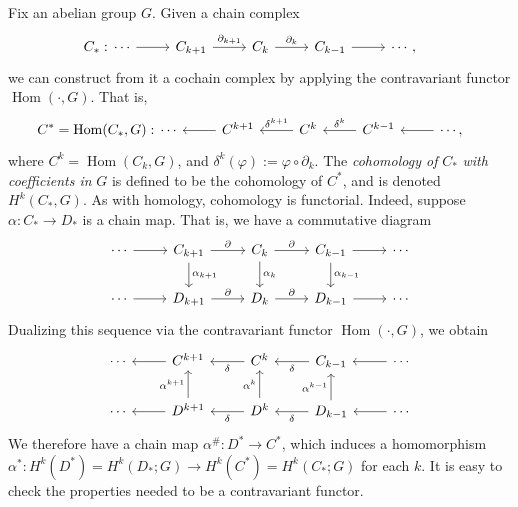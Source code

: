 \documentclass{book}
\renewcommand{\phi}{\varphi}
\DeclareMathOperator{\Hom}{Hom}
\theoremstyle{definition}
\theoremstyle{remark}
\numberwithin{equation}{section}
\begin{document}
Fix an abelian group $G$. Given a chain complex
\begin{equation}
    \begin{aligned}
        C_*: 
        & 
        \begin{tikzcd}
            \cdots \arrow[r] & C_{k+1} \arrow[r,"\partial_{k+1}"] & C_k \arrow[r,"\partial_k"] & C_{k-1} \arrow[r] & \cdots,
        \end{tikzcd} 
        & 
        \hphantom{ }
    \end{aligned} 
\end{equation}
we can construct from it a cochain complex by applying the contravariant functor $\Hom(\cdot,G)$. That is, 
\begin{equation} \label{eq:dualOfAChainComplex}
    \begin{aligned}
        C^* = \Hom(C_*,G): 
        & 
        \begin{tikzcd}
            \cdots & C^{k+1} \arrow[l] & C^k \arrow[l,"\delta^{k+1}" above] & C^{k-1} \arrow[l,"\delta^k" above] & \cdots \arrow[l],
        \end{tikzcd} 
        & 
        \hphantom{ }
    \end{aligned} 
\end{equation}
where $C^k = \Hom(C_k,G)$, and $\delta^k(\phi) := \phi\circ\partial_k$. The \textit{cohomology of} $C_*$ \textit{with coefficients in} $G$ is defined to be the cohomology of $C^*$, and is denoted $H^k(C_*,G)$. As with homology, cohomology is functorial. Indeed, suppose $\alpha \colon C_* \to D_*$ is a chain map. That is, we have a commutative diagram 
\begin{equation} \begin{tikzcd}
    \cdots \arrow[r] & C_{k+1} \arrow[r,"\partial"] \arrow[d,"\alpha_{k+1}"] & C_{k} \arrow[r,"\partial"] \arrow[d,"\alpha_{k}"] & C_{k-1} \arrow[r] \arrow[d,"\alpha_{k-1}"] & \cdots \\
    \cdots \arrow[r] & D_{k+1} \arrow[r,"\partial"]                          & D_{k} \arrow[r,"\partial"]                        & D_{k-1} \arrow[r]                          & \cdots
\end{tikzcd} \end{equation}
Dualizing this sequence via the contravariant functor $\Hom(\cdot,G)$, we obtain 
\begin{equation} \begin{tikzcd}
    \cdots & C^{k+1} \arrow[l]                          & C^{k} \arrow[l,"\delta"]                        & C_{k-1} \arrow[l,"\delta"]                          & \cdots \arrow[l] \\
    \cdots & D^{k+1} \arrow[l] \arrow[u,"\alpha^{k+1}"] & D^{k} \arrow[l,"\delta"] \arrow[u,"\alpha^{k}"] & D_{k-1} \arrow[l,"\delta"] \arrow[u,"\alpha^{k-1}"] & \cdots \arrow[l]
\end{tikzcd} \end{equation}
We therefore have a chain map $\alpha^\# \colon D^* \to C^*$, which induces a homomorphism $\alpha^* \colon H^k(D^*) = H^k(D_*;G) \to H^k(C^*) = H^k(C_*;G)$ for each $k$. It is easy to check the properties needed to be a contravariant functor.
\end{document}
